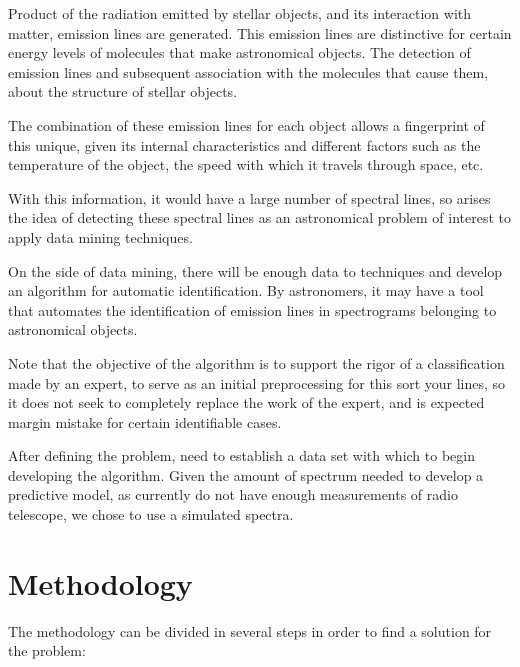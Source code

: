 \documentclass[twocolumn, draft]{emulateapj}
\begin{document}
Product of the radiation emitted by stellar objects, and its interaction with matter, emission lines are generated. This emission lines are distinctive for certain energy levels of molecules that make astronomical objects. The detection of emission lines and subsequent association with the molecules that cause them, about the structure of stellar objects.

The combination of these emission lines for each object allows a fingerprint of this unique, given its internal characteristics and different factors such as the temperature of the object, the speed with which it travels through space, etc.

With this information, it would have a large number of spectral lines, so arises the idea of ​​detecting these spectral lines as an astronomical problem of interest to apply data mining techniques.

On the side of data mining, there will be enough data to techniques and develop an algorithm for automatic identification. By astronomers, it may have a tool that automates the identification of emission lines in spectrograms belonging to astronomical objects.

Note that the objective of the algorithm is to support the rigor of a classification made by an expert, to serve as an initial preprocessing for this sort your lines, so it does not seek to completely replace the work of the expert, and is expected margin mistake for certain identifiable cases.

After defining the problem, need to establish a data set with which to begin developing the algorithm. Given the amount of spectrum needed to develop a predictive model, as currently do not have enough measurements of radio telescope, we chose to use a simulated spectra.


\section{Methodology}
\label{sec:methodology}

The methodology can be divided in several steps in order to find a solution for the problem:
\end{document}
